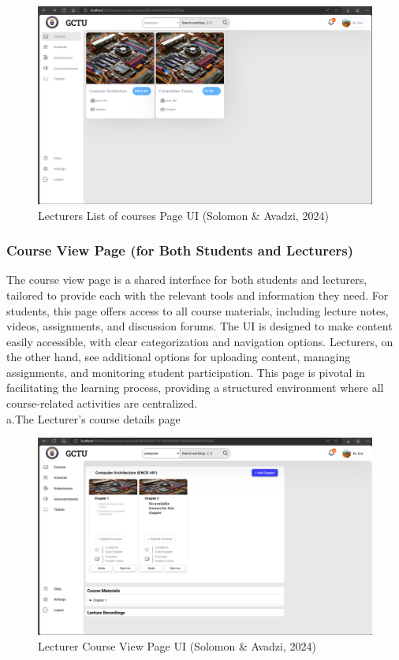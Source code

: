 \documentclass[a4paper,12pt]{article}  %
\begin{document}
\begin{figure}[H]
      \centering
      \includegraphics[width=1\textwidth]{figures/lecturers-courses.png}
      \caption{Lecturers List of courses Page UI (Solomon \& Avadzi, 2024)}
\end{figure}

\subsubsection{Course View Page (for Both Students and Lecturers)}
The course view page is a shared interface for both students and lecturers, tailored to provide each with the relevant tools and information they need. For students, this page offers access to all course materials, including lecture notes, videos, assignments, and discussion forums. The UI is designed to make content easily accessible, with clear categorization and navigation options. Lecturers, on the other hand, see additional options for uploading content, managing assignments, and monitoring student participation. This page is pivotal in facilitating the learning process, providing a structured environment where all course-related activities are centralized.\\

a.The Lecturer’s course details page\\
\begin{figure}[H]
      \centering
      \includegraphics[width=1\textwidth]{figures/lect-c-dets.png}
      \caption{Lecturer Course View Page UI (Solomon \& Avadzi, 2024)}
\end{figure}
\end{document}
